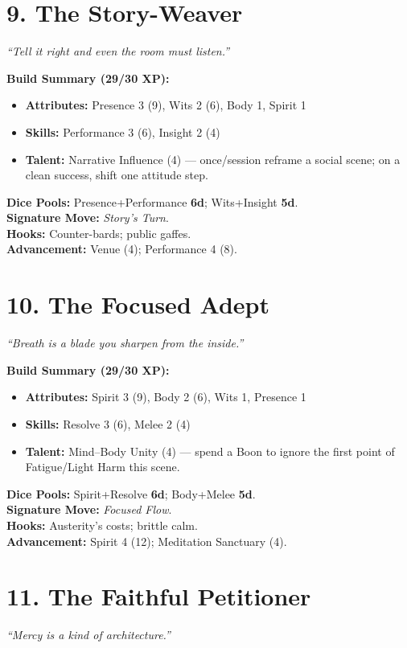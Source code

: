 \begin{multicols}{2}
\section{9. The Story-Weaver}
\textit{“Tell it right and even the room must listen.”}

\textbf{Build Summary (29/30 XP):}
\begin{itemize}
  \item \textbf{Attributes:} Presence 3 (9), Wits 2 (6), Body 1, Spirit 1
  \item \textbf{Skills:} Performance 3 (6), Insight 2 (4)
  \item \textbf{Talent:} Narrative Influence (4) — once/session reframe a social scene; on a clean success, shift one attitude step.
\end{itemize}
\textbf{Dice Pools:} Presence+Performance \textbf{6d}; Wits+Insight \textbf{5d}.\\
\textbf{Signature Move:} \emph{Story’s Turn}.\\
\textbf{Hooks:} Counter-bards; public gaffes.\\
\textbf{Advancement:} Venue (4); Performance 4 (8).

\section{10. The Focused Adept}
\textit{“Breath is a blade you sharpen from the inside.”}

\textbf{Build Summary (29/30 XP):}
\begin{itemize}
  \item \textbf{Attributes:} Spirit 3 (9), Body 2 (6), Wits 1, Presence 1
  \item \textbf{Skills:} Resolve 3 (6), Melee 2 (4)
  \item \textbf{Talent:} Mind–Body Unity (4) — spend a Boon to ignore the first point of Fatigue/Light Harm this scene.
\end{itemize}
\textbf{Dice Pools:} Spirit+Resolve \textbf{6d}; Body+Melee \textbf{5d}.\\
\textbf{Signature Move:} \emph{Focused Flow}.\\
\textbf{Hooks:} Austerity’s costs; brittle calm.\\
\textbf{Advancement:} Spirit 4 (12); Meditation Sanctuary (4).

\section{11. The Faithful Petitioner}
\textit{“Mercy is a kind of architecture.”}


\end{multicols}
